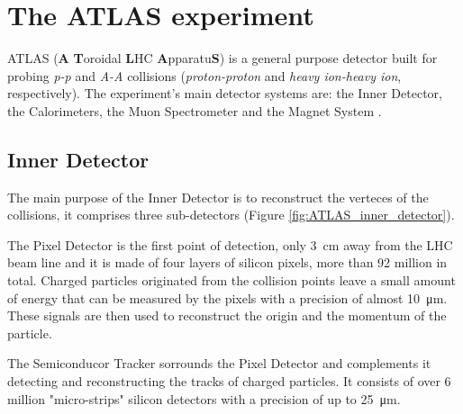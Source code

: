 \section{The ATLAS experiment}%

ATLAS (\textbf{A} \textbf{T}oroidal \textbf{L}HC \textbf{A}pparatu\textbf{S}) is a general purpose detector built for probing \textit{p-p} and \textit{A-A} collisions (\textit{proton-proton} and \textit{heavy ion-heavy ion}, respectively). The experiment's main detector systems are: the Inner Detector, the Calorimeters, the Muon Spectrometer and the Magnet System \cite{Collaboration_The_ATLAS2008}.

\begin{figure}[hb]
    \centering
    \hfill
    \centering
\end{figure}


\subsection{Inner Detector}\label{sec:ATLAS_inner_detector}

The main purpose of the Inner Detector is to reconstruct the verteces of the collisions, it comprises three sub-detectors (Figure \ref{fig:ATLAS_inner_detector}).

The Pixel Detector is the first point of detection, only \qty{3}{\centi\meter} away from the LHC beam line and it is made of four layers of silicon pixels, more than 92 million in total. Charged particles originated from the collision points leave a small amount of energy that can be measured by the pixels with a precision of almost \qty{10}{\micro\meter}. These signals are then used to reconstruct the origin and the momentum of the particle.

The Semiconducor Tracker sorrounds the Pixel Detector and complements it detecting and reconstructing the tracks of charged particles. It consists of over 6 million "micro-strips" silicon detectors with a precision of up to \qty{25}{\micro\meter}.

